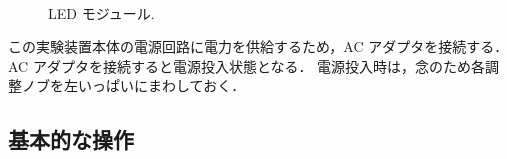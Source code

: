 \documentclass[11pt,sort]{jarticle}
\begin{document}
\begin{figure}[t]
\begin{minipage}[t]{.45\textwidth}
\begin{center}
\\
\caption{LED モジュール. }\label{fig:LED_module} 
\end{center}
\end{minipage}
\end{figure}

この実験装置本体の電源回路に電力を供給するため，AC アダプタを接続する．
AC アダプタを接続すると電源投入状態となる．
電源投入時は，念のため各調整ノブを左いっぱいにまわしておく．

\subsection{基本的な操作}
\end{document}
